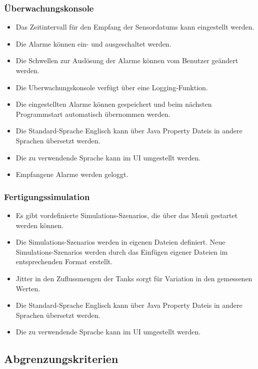 \documentclass[parskip=full]{scrartcl}
\begin{document}
\subsubsection{Überwachungskonsole}
\begin{itemize}
  \item Das Zeitintervall für den Empfang der \glspl{Sensordatum} kann eingestellt werden.
  \item Die Alarme k\"onnen ein- und ausgeschaltet werden.
  \item Die Schwellen zur Ausl\"osung der Alarme k\"onnen vom Benutzer ge\"andert werden.
  \item Die \gls{Uberwachungskonsole} verfügt über eine Logging-Funktion.
  \item Die eingestellten Alarme k\"onnen gespeichert und beim n\"achsten Programmstart automatisch
    \"ubernommen werden.
  \item Die Standard-Sprache Englisch kann über \glspl{Java Property Datei} in andere Sprachen übersetzt werden.
  \item Die zu verwendende Sprache kann im UI umgestellt werden.
  \item Empfangene Alarme werden geloggt.
\end{itemize}

\subsubsection{Fertigungssimulation}
\begin{itemize}
  \item Es gibt vordefinierte \glspl{Simulations-Szenario}, die über das Menü gestartet werden können.
  \item Die \glspl{Simulations-Szenario} werden in eigenen Dateien definiert. Neue \glspl{Simulations-Szenario}
    werden durch das Einf\"ugen eigener Dateien im entsprechenden Format erstellt.
  \item \gls{Jitter} in den Zuflussmengen der Tanks sorgt f\"ur Variation in den gemessenen Werten.
  \item Die Standard-Sprache Englisch kann über \glspl{Java Property Datei} in andere Sprachen übersetzt werden.
  \item Die zu verwendende Sprache kann im UI umgestellt werden.
\end{itemize}

\subsection{Abgrenzungskriterien}
\end{document}
